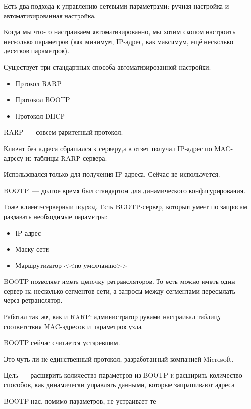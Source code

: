 
Есть два подхода к управлению сетевыми параметрами: ручная настройка и автоматизированная настройка. 

Когда мы что-то настраиваем автоматизированно, мы хотим скопом настроить несколько параметров (как минимум, IP-адрес, как максимум, ещё несколько десятков параметров).

Существует три стандартных способа автоматизированной настройки:
\begin{itemize}
    \item Пртокол RARP
    \item Протокол BOOTP
    \item Протокол DHCP
\end{itemize}


RARP~--- совсем раритетный протокол.

Клиент без адреса обращался к серверу,а в ответ получал IP-адрес по MAC-адресу из таблицы RARP-сервера.

Использовался только для получения IP-адреса. Сейчас не используется.

BOOTP~--- долгое время был стандартом для динамического конфигурирования.

Тоже клиент-серверный подход. Есть BOOTP-сервер, который умеет по запросам раздавать необходимые параметры:
\begin{itemize}
    \item IP-адрес
    \item Маску сети
    \item Маршрутизатор <<по умолчанию>>
\end{itemize}

BOOTP позволяет иметь цепочку ретрансляторов. То есть можно иметь один сервер на несколько сегментов сети, а запросы между сегментами пересылать через ретранслятор.

Работал так же, как и RARP: администратор руками настраивал таблицу соответствия MAC-адресов и параметров узла.

BOOTP сейчас считается устаревшим.


Это чуть ли не единственный протокол, разработанный компанией Microsoft.

Цель~--- расширить количество параметров из BOOTP и расширить количество способов, как динамически управлять данными, которые запрашивают адреса.

BOOTP нас, помимо параметров, не устраивает те